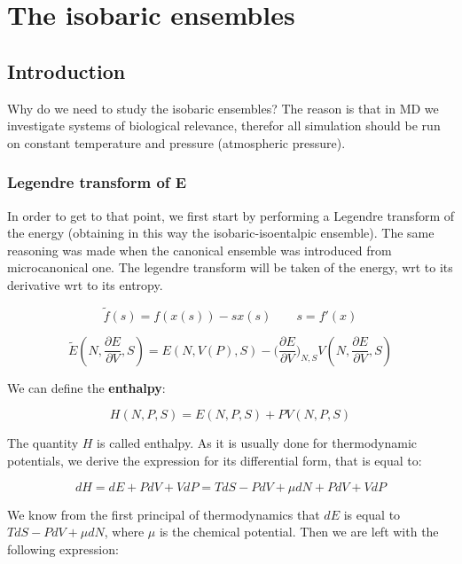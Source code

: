 \graphicspath{{chapters/12/images/}}
\chapter{The isobaric ensembles}

\section{Introduction}
Why do we need to study the isobaric ensembles?
The reason is that in MD we investigate systems of biological relevance, therefor all simulation should be run on constant temperature and pressure (atmospheric pressure).

	\subsection{Legendre transform of E}
	In order to get to that point, we first start by performing a Legendre transform of the energy (obtaining in this way the isobaric-isoentalpic ensemble).
	The same reasoning was made when the canonical ensemble was introduced from microcanonical one.
	The legendre transform will be taken of the energy, wrt to its derivative wrt to its entropy.

	$$\tilde{f}(s) = f(x(s))-sx(s)\qquad s = f'(x)$$

	$$\tilde{E}(N, \frac{\partial E}{\partial V}, S) = E(N, V(P), S) - \biggl(\frac{\partial E}{\partial V}\biggr)_{N, S}V(N, \frac{\partial E}{\partial V}, S)$$


	We can define the \textbf{enthalpy}:

	$$H(N, P, S) = E(N, P, S) + PV(N, P, S)$$

	The quantity $H$ is called enthalpy. As it is usually done for thermodynamic potentials, we derive the expression for its differential form, that is equal to:

	$$dH = dE + PdV + VdP = TdS - PdV + \mu dN + PdV + VdP$$

	We know from the first principal of thermodynamics that $dE$ is equal to $TdS - PdV + \mu dN$, where $\mu$ is the chemical potential. Then we are left with the following expression:

